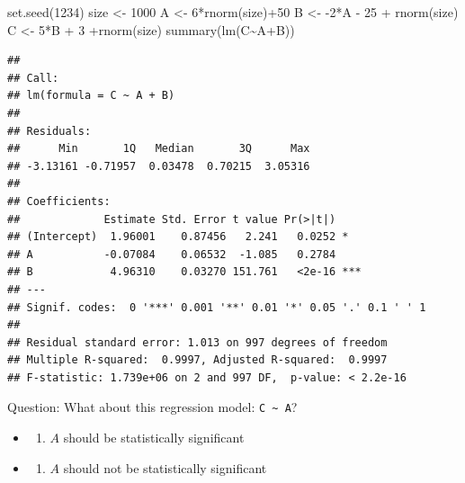 \documentclass[
]{article}
\newenvironment{Shaded}{\begin{snugshade}}{\end{snugshade}}
\newcommand{\DecValTok}[1]{\textcolor[rgb]{0.00,0.00,0.81}{#1}}
\newcommand{\FunctionTok}[1]{\textcolor[rgb]{0.00,0.00,0.00}{#1}}
\newcommand{\NormalTok}[1]{#1}
\newcommand{\OtherTok}[1]{\textcolor[rgb]{0.56,0.35,0.01}{#1}}
\newcommand{\SpecialCharTok}[1]{\textcolor[rgb]{0.00,0.00,0.00}{#1}}
\providecommand{\tightlist}{%
  \setlength{\itemsep}{0pt}\setlength{\parskip}{0pt}}
\begin{document}
\begin{Shaded}
\begin{Highlighting}[]
\FunctionTok{set.seed}\NormalTok{(}\DecValTok{1234}\NormalTok{)}
\NormalTok{size }\OtherTok{\textless{}{-}} \DecValTok{1000}
\NormalTok{A }\OtherTok{\textless{}{-}} \DecValTok{6}\SpecialCharTok{*}\FunctionTok{rnorm}\NormalTok{(size)}\SpecialCharTok{+}\DecValTok{50}
\NormalTok{B }\OtherTok{\textless{}{-}} \SpecialCharTok{{-}}\DecValTok{2}\SpecialCharTok{*}\NormalTok{A }\SpecialCharTok{{-}} \DecValTok{25} \SpecialCharTok{+} \FunctionTok{rnorm}\NormalTok{(size)}
\NormalTok{C }\OtherTok{\textless{}{-}} \DecValTok{5}\SpecialCharTok{*}\NormalTok{B }\SpecialCharTok{+} \DecValTok{3} \SpecialCharTok{+}\FunctionTok{rnorm}\NormalTok{(size)}
\FunctionTok{summary}\NormalTok{(}\FunctionTok{lm}\NormalTok{(C}\SpecialCharTok{\textasciitilde{}}\NormalTok{A}\SpecialCharTok{+}\NormalTok{B))}
\end{Highlighting}
\end{Shaded}

\begin{verbatim}
## 
## Call:
## lm(formula = C ~ A + B)
## 
## Residuals:
##      Min       1Q   Median       3Q      Max 
## -3.13161 -0.71957  0.03478  0.70215  3.05316 
## 
## Coefficients:
##             Estimate Std. Error t value Pr(>|t|)    
## (Intercept)  1.96001    0.87456   2.241   0.0252 *  
## A           -0.07084    0.06532  -1.085   0.2784    
## B            4.96310    0.03270 151.761   <2e-16 ***
## ---
## Signif. codes:  0 '***' 0.001 '**' 0.01 '*' 0.05 '.' 0.1 ' ' 1
## 
## Residual standard error: 1.013 on 997 degrees of freedom
## Multiple R-squared:  0.9997, Adjusted R-squared:  0.9997 
## F-statistic: 1.739e+06 on 2 and 997 DF,  p-value: < 2.2e-16
\end{verbatim}

Question: What about this regression model:
\texttt{C\ \textasciitilde{}\ A}?

\begin{itemize}
\item
  \begin{enumerate}
  \def\labelenumi{\alph{enumi})}
  \tightlist
  \item
    \(A\) should be statistically significant
  \end{enumerate}
\item
  \begin{enumerate}
  \def\labelenumi{\alph{enumi})}
  \setcounter{enumi}{1}
  \tightlist
  \item
    \(A\) should not be statistically significant
  \end{enumerate}
\end{itemize}
\end{document}

